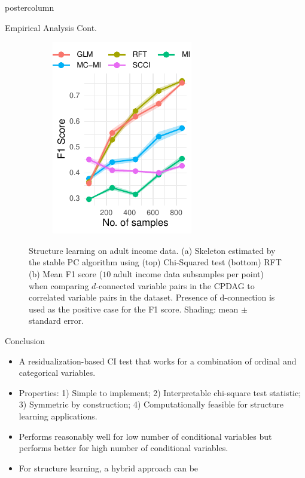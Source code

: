 \documentclass{beamer}
\begin{document}
\begin{frame}
\begin{columns}
\begin{column}{0.33\textwidth}
\begin{beamercolorbox}[center]{postercolumn}
\begin{minipage}{.98\textwidth}
{\begin{myblock}{Empirical Analysis Cont.}
\begin{figure}
\begin{subfigure}[t]{0.55\textwidth}
				\caption{}
				\label{fig:sl_adult_model}
			\end{subfigure}%
			\begin{subfigure}[t]{0.4\textwidth}
				\includegraphics[scale=2.7]{../in_person/imgs/adult_F1.pdf}
				\caption{}
				\label{fig:sl_adult}
			\end{subfigure}
			\caption{Structure learning on adult income data. (a) Skeleton
				estimated by the stable PC algorithm using
				(top) Chi-Squared test (bottom) RFT (b) Mean F1
				score ($10$ adult income data subsamples per
				point) when comparing $d$-connected variable
				pairs in the CPDAG to correlated variable pairs
				in the dataset. Presence of d-connection is
				used as the positive case for the F1 score.
				Shading: mean $\pm$ standard error.}
		\end{figure}
	\end{myblock}\vfill
	\begin{myblock}{Conclusion}
		\begin{itemize}
			\item A residualization-based CI test that works for a
				combination of ordinal and categorical
				variables.
			\item Properties: 1) Simple to implement; 2)
				Interpretable chi-square test statistic; 3)
				Symmetric by construction; 4) Computationally
				feasible for structure learning applications.
			\item Performs reasonably well for low number of
				conditional variables but performs better for
				high number of conditional variables.
			\item For structure learning, a hybrid approach can be

\end{itemize}
\end{myblock}}
\end{minipage}
\end{beamercolorbox}
\end{column}
\end{columns}
\end{frame}
\end{document}

